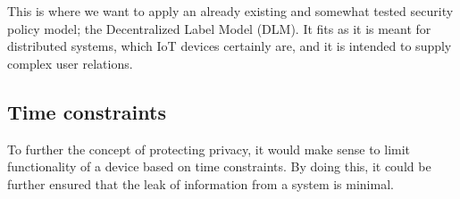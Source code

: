 This is where we want to apply an already existing and somewhat tested security policy model; the Decentralized Label Model (DLM).
It fits as it is meant for distributed systems, which IoT devices certainly are, and it is intended to supply complex user relations.

\subsection{Time constraints}
To further the concept of protecting privacy, it would make sense to limit functionality of a device based on time constraints.
By doing this, it could be further ensured that the leak of information from a system is minimal.
